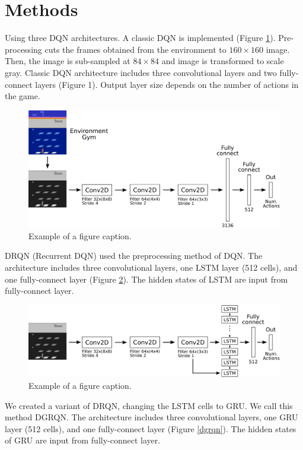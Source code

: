 \documentclass[conference]{IEEEtran}
\begin{document}
\section{Methods}

Using three DQN architectures. A classic DQN is implemented (Figure \ref{dqn}). Pre-processing cuts the frames obtained from the environment to $160\times160$ image. Then, the image is sub-sampled at $84\times84$ and image is transformed to scale gray. Classic DQN architecture includes three convolutional layers and two fully-connect layers (Figure 1). Output layer size depends on the number of actions in the game. 

\begin{figure}[htbp]
\centerline{\includegraphics[width=\linewidth]{images/DQN.png}}
\caption{Example of a figure caption.}
\label{dqn}
\end{figure}

DRQN (Recurrent DQN) used the preprocessing method of DQN. The architecture includes three convolutional layers, one LSTM layer (512 cells), and one fully-connect layer (Figure \ref{drqn}). The hidden states of LSTM are input from fully-connect layer.

\begin{figure}[htbp]
\centerline{\includegraphics[width=\linewidth]{images/DRQN.png}}
\caption{Example of a figure caption.}
\label{drqn}
\end{figure}

We created a variant of DRQN, changing the LSTM cells to GRU. We call this method DGRQN. The architecture includes three convolutional layers, one GRU layer (512 cells), and one fully-connect layer (Figure \ref{dgrqn}). The hidden states of GRU are input from fully-connect layer.
\end{document}
